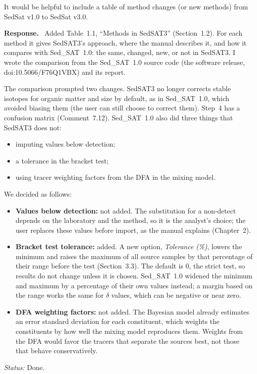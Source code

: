 \documentclass[11pt]{article}
\newcounter{cmt}
\newcounter{grp}
\renewcommand{\thecmt}{\thegrp.\arabic{cmt}}
\newenvironment{reviewer}[1]{%
  \refstepcounter{cmt}%
  \begin{tcolorbox}[enhanced,breakable,colback=commentbg,colframe=usgsgreen!60,
    boxrule=0.4pt,left=6pt,right=6pt,top=4pt,bottom=4pt,
    title={\small\textbf{Comment \thecmt}\hfill\textit{#1}},
    coltitle=black,colbacktitle=usgsgreen!15,fonttitle=\small]}%
  {\end{tcolorbox}}
\newenvironment{response}{\par\noindent\textbf{Response.}\ }{\par\medskip}
\newcommand{\status}[1]{\par\noindent\textit{Status:} #1\par}
\begin{document}
\begin{reviewer}{Review notes}
It would be helpful to include a table of method changes (or new methods) from
SedSat v1.0 to SedSat v3.0.
\end{reviewer}
\begin{response}
Added Table~1.1, ``Methods in SedSAT3'' (Section~1.2). For each method it
gives SedSAT3's approach, where the manual describes it, and how it compares
with Sed\_SAT~1.0: the same, changed, new, or not in SedSAT3. I wrote the
comparison from the Sed\_SAT~1.0 source code (the software release,
doi:10.5066/F76Q1VBX) and its report.

The comparison prompted two changes. SedSAT3 no longer corrects stable
isotopes for organic matter and size by default, as in Sed\_SAT~1.0, which
avoided biasing them (the user can still choose to correct them). Step~4 has a
confusion matrix (Comment~7.12). Sed\_SAT~1.0 also did three things that
SedSAT3 does not:
\begin{itemize}
    \item imputing values below detection;
    \item a tolerance in the bracket test;
    \item using tracer weighting factors from the DFA in the mixing model.
\end{itemize}
We decided as follows:
\begin{itemize}
    \item \textbf{Values below detection:} not added. The substitution for a
          non-detect depends on the laboratory and the method, so it is the
          analyst's choice; the user replaces these values before import, as
          the manual explains (Chapter~2).
    \item \textbf{Bracket test tolerance:} added. A new option,
          \textit{Tolerance (\%)}, lowers the minimum and raises the maximum of
          all source samples by that percentage of their range before the test
          (Section~3.3). The default is 0, the strict test, so results do not
          change unless it is chosen. Sed\_SAT~1.0 widened the minimum and
          maximum by a percentage of their own values instead; a margin based
          on the range works the same for $\delta$ values, which can be
          negative or near zero.
    \item \textbf{DFA weighting factors:} not added. The Bayesian model already
          estimates an error standard deviation for each constituent, which
          weights the constituents by how well the mixing model reproduces
          them. Weights from the DFA would favor the tracers that separate the
          sources best, not those that behave conservatively.
\end{itemize}
\end{response}
\status{Done.}
\end{document}
